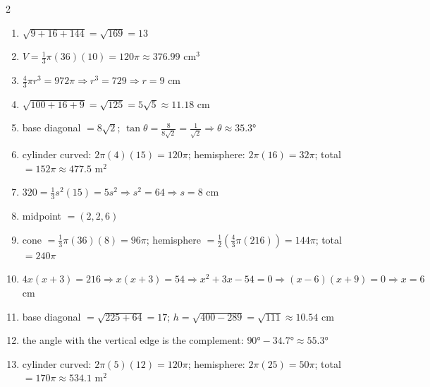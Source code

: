 \documentclass[11pt]{article}
\begin{document}
\begin{keybox}
\begin{multicols}{2}
\small
\begin{enumerate}[leftmargin=*,itemsep=3pt]
  \item $\sqrt{9+16+144}=\sqrt{169}=13$
  \item $V=\tfrac13\pi(36)(10)=120\pi\approx376.99\text{ cm}^3$
  \item $\tfrac43\pi r^3=972\pi\Rightarrow r^3=729\Rightarrow r=9$ cm
  \item $\sqrt{100+16+9}=\sqrt{125}=5\sqrt5\approx11.18$ cm
  \item base diagonal $=8\sqrt2$; $\tan\theta=\tfrac{8}{8\sqrt2}=\tfrac{1}{\sqrt2}\Rightarrow\theta\approx35.3°$
  \item cylinder curved: $2\pi(4)(15)=120\pi$; hemisphere: $2\pi(16)=32\pi$; total $=152\pi\approx477.5\text{ m}^2$
  \item $320=\tfrac13s^2(15)=5s^2\Rightarrow s^2=64\Rightarrow s=8$ cm
  \item midpoint $=(2,2,6)$
  \item cone $=\tfrac13\pi(36)(8)=96\pi$; hemisphere $=\tfrac12\left(\tfrac43\pi(216)\right)=144\pi$; total $=240\pi$
  \item $4x(x+3)=216\Rightarrow x(x+3)=54\Rightarrow x^2+3x-54=0\Rightarrow(x-6)(x+9)=0\Rightarrow x=6$ cm
  \item base diagonal $=\sqrt{225+64}=17$; $h=\sqrt{400-289}=\sqrt{111}\approx10.54$ cm
  \item the angle with the vertical edge is the complement: $90°-34.7°\approx55.3°$
  \item cylinder curved: $2\pi(5)(12)=120\pi$; hemisphere: $2\pi(25)=50\pi$; total $=170\pi\approx534.1\text{ m}^2$
\end{enumerate}
\end{multicols}
\end{keybox}
\end{document}
